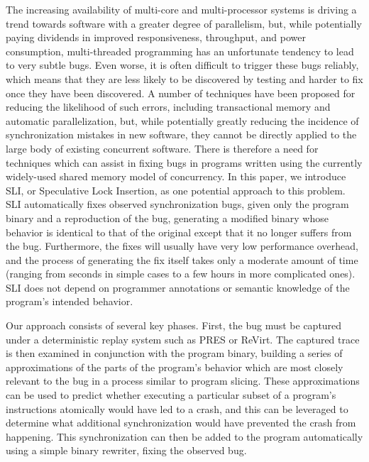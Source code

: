 \documentclass[10pt,twocolumn,preprint,natbib,authoryear]{sigplanconf}
\begin{document}
The increasing availability of multi-core and multi-processor systems
is driving a trend towards software with a greater degree of
parallelism, but, while potentially paying dividends in improved
responsiveness, throughput, and power consumption, multi-threaded
programming has an unfortunate tendency to lead to very subtle bugs.
Even worse, it is often difficult to trigger these bugs reliably,
which means that they are less likely to be discovered by testing and
harder to fix once they have been discovered.  A number of techniques
have been proposed for reducing the likelihood of such errors,
including transactional memory\cite{Shavit1997} and automatic
parallelization\cite{Bacon1994}, but, while potentially greatly
reducing the incidence of synchronization mistakes in new software,
they cannot be directly applied to the large body of existing
concurrent software.  There is therefore a need for techniques which
can assist in fixing bugs in programs written using the currently
widely-used shared memory model of concurrency.  In this paper, we
introduce SLI, or Speculative Lock Insertion, as one potential
approach to this problem.  SLI automatically fixes observed
synchronization bugs, given only the program binary and a reproduction
of the bug, generating a modified binary whose behavior is identical
to that of the original except that it no longer suffers from the bug.
Furthermore, the fixes will usually have very low performance
overhead, and the process of generating the fix itself takes only a
moderate amount of time (ranging from seconds in simple cases to a few
hours in more complicated ones).  SLI does not depend on programmer
annotations or semantic knowledge of the program's intended behavior.

Our approach consists of several key phases.  First, the bug must be
captured under a deterministic replay system such as
PRES\cite{Park2009} or ReVirt\cite{Dunlap2002}.  The captured trace is
then examined in conjunction with the program binary, building a
series of approximations of the parts of the program's behavior which
are most closely relevant to the bug in a process similar to program
slicing\cite{Weiser1979}.  These approximations can be used to predict
whether executing a particular subset of a program's instructions
atomically would have led to a crash, and this can be leveraged to
determine what additional synchronization would have prevented the
crash from happening.  This synchronization can then be added to the
program automatically using a simple binary rewriter, fixing the
observed bug.
\end{document}
